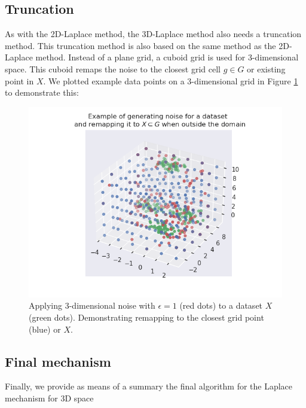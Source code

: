\subsection{Truncation}
As with the 2D-Laplace method, the 3D-Laplace method also needs a truncation method.
This truncation method is also based on the same method as the 2D-Laplace method.
Instead of a plane grid, a cuboid grid is used for 3-dimensional space.
This cuboid remaps the noise to the closest grid cell $g \in G$ or existing point in $X$.
We plotted example data points on a 3-dimensional grid in Figure \ref{fig:3d-laplace-example} to demonstrate this:
\begin{figure} [H]
  \includegraphics[width=\textwidth]{TheorethicalFramework/ND-Laplace/Images/example_3d_laplace.png}
  \caption{Applying 3-dimensional noise with $\epsilon = 1$ (red dots) to a dataset $X$ (green dots). Demonstrating remapping to the closest grid point (blue) or $X$.}
  \label{fig:3d-laplace-example}
\end{figure}

\newpage
\subsection{Final mechanism}
Finally, we provide as means of a summary the final algorithm for the Laplace mechanism for 3D space

\newpage